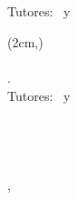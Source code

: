 \begin{titlepage}
	\centering
    \MAINCover

    \vfill	
	{\fontsize{64pt}{64pt}\color{black}\huge{\thesisTitle} \\[14mm]}
	{\fontsize{20pt}{20pt}\color{black}\thesisName} \\[5mm]
    {\color{black} Tutores: \thesisFirstSupervisor\ y \thesisSecondSupervisor}
	\vfill

	{\color{white}\thesisDate}
	\restoregeometry


\end{titlepage}



\clearpage
\begin{textblock*}{10cm}(2cm,\dimexpr\paperheight-10cm\relax)
	\small
	\textbf{\thesisName} \\
	\textit{\thesisTitle} \\
    \thesisSubject. \thesisDate \\
	Tutores: \thesisFirstSupervisor\ y \thesisSecondSupervisor \\[1.5em]
	\textbf{\thesisUniversityStudies} \\
	\textit{\thesisUniversity} \\
	\thesisUniversitySchool \\
	\thesisUniversityStreetAddress \\
	\thesisUniversityPostalCode, \thesisUniversityCity
    \ThesisSeparator
\end{textblock*}
